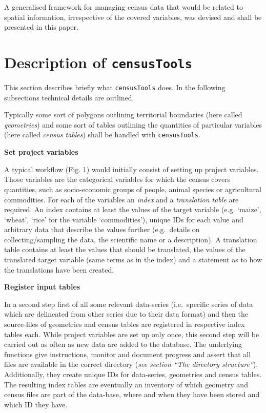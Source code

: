 \documentclass[12pt,]{article}
\begin{document}
A generalised framework for managing census data that would be related to spatial information, irrespective of the covered variables, was devised and shall be presented in this paper.

\hypertarget{description-of-censustools}{%
\section{\texorpdfstring{Description of \texttt{censusTools}}{Description of censusTools}}\label{description-of-censustools}}

This section describes briefly what \texttt{censusTools} does. In the following subsections technical details are outlined.

Typically some sort of polygons outlining territorial boundaries (here called \emph{geometries}) and some sort of tables outlining the quantities of particular variables (here called \emph{census tables}) shall be handled with \texttt{censusTools}.

\textbf{Set project variables}

A typical workflow (Fig. 1) would initially consist of setting up project variables.
Those variables are the categorical variables for which the census covers quantities, such as socio-economic groups of people, animal species or agricultural commodities.
For each of the variables an \emph{index} and a \emph{translation table} are required.
An index contains at least the values of the target variable (e.g. `maize', `wheat', `rice' for the variable `commodities'), unique IDs for each value and arbitrary data that describe the values further (e.g.~details on collecting/sampling the data, the scientific name or a description).
A translation table contains at least the values that should be translated, the values of the translated target variable (same terms as in the index) and a statement as to how the translations have been created.

\textbf{Register input tables}

In a second step first of all some relevant data-series (i.e.~specific series of data which are delineated from other series due to their data format) and then the source-files of geometries and census tables are registered in respective index tables each.
While project variables are set up only once, this second step will be carried out as often as new data are added to the database.
The underlying functions give instructions, monitor and document progress and assert that all files are available in the correct directory (\emph{see section ``The directory structure''}).
Additionally, they create unique IDs for data-series, geometries and census tables.
The resulting index tables are eventually an inventory of which geometry and census files are part of the data-base, where and when they have been stored and which ID they have.
\end{document}
